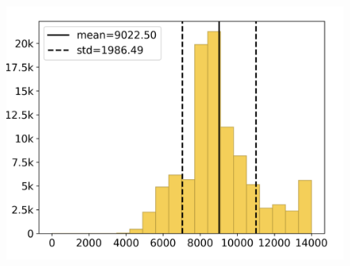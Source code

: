 \begin{figure}[H]
\begin{minipage}{.325\textwidth}
	\end{minipage}
	\begin{minipage}{.325\textwidth}
		\includegraphics[width=\textwidth, clip, trim=.25cm 0.25cm .25cm 0.25cm]{Resources/Images/Histogram/hist_3_a.png}
	\end{minipage}
	

\end{figure}
